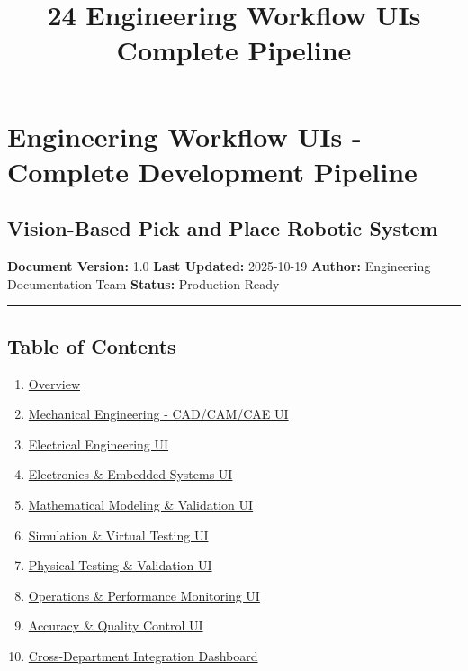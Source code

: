 \documentclass[
]{article}
\title{24 Engineering Workflow UIs Complete Pipeline}
\author{}
\date{}
\providecommand{\tightlist}{%
  \setlength{\itemsep}{0pt}\setlength{\parskip}{0pt}}
\begin{document}
\maketitle

{
\setcounter{tocdepth}{3}
\tableofcontents
}
\hypertarget{engineering-workflow-uis---complete-development-pipeline}{%
\section{Engineering Workflow UIs - Complete Development
Pipeline}\label{engineering-workflow-uis---complete-development-pipeline}}

\hypertarget{vision-based-pick-and-place-robotic-system}{%
\subsection{Vision-Based Pick and Place Robotic
System}\label{vision-based-pick-and-place-robotic-system}}

\textbf{Document Version:} 1.0 \textbf{Last Updated:} 2025-10-19
\textbf{Author:} Engineering Documentation Team \textbf{Status:}
Production-Ready

\begin{center}\rule{0.5\linewidth}{0.5pt}\end{center}

\hypertarget{table-of-contents}{%
\subsection{Table of Contents}\label{table-of-contents}}

\begin{enumerate}
\def\labelenumi{\arabic{enumi}.}
\tightlist
\item
  \protect\hyperlink{overview}{Overview}
\item
  \protect\hyperlink{mechanical-engineering-cadcamcae-ui}{Mechanical
  Engineering - CAD/CAM/CAE UI}
\item
  \protect\hyperlink{electrical-engineering-ui}{Electrical Engineering
  UI}
\item
  \protect\hyperlink{electronics--embedded-systems-ui}{Electronics \&
  Embedded Systems UI}
\item
  \protect\hyperlink{mathematical-modeling--validation-ui}{Mathematical
  Modeling \& Validation UI}
\item
  \protect\hyperlink{simulation--virtual-testing-ui}{Simulation \&
  Virtual Testing UI}
\item
  \protect\hyperlink{physical-testing--validation-ui}{Physical Testing
  \& Validation UI}
\item
  \protect\hyperlink{operations--performance-monitoring-ui}{Operations
  \& Performance Monitoring UI}
\item
  \protect\hyperlink{accuracy--quality-control-ui}{Accuracy \& Quality
  Control UI}
\item
  \protect\hyperlink{cross-department-integration-dashboard}{Cross-Department
  Integration Dashboard}
\end{enumerate}
\end{document}
